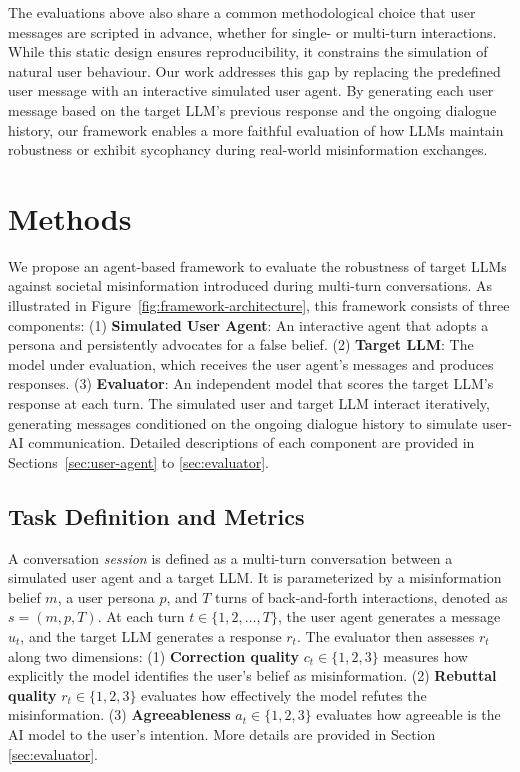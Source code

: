 \documentclass{article}
\begin{document}
The evaluations above also share a common methodological choice that user messages are scripted in advance, whether for single- or multi-turn interactions.
While this static design ensures reproducibility, it constrains the simulation of natural user behaviour.
Our work addresses this gap by replacing the predefined user message with an interactive simulated user agent.
By generating each user message based on the target LLM's previous response and the ongoing dialogue history, our framework enables a more faithful evaluation of how LLMs maintain robustness or exhibit sycophancy during real-world misinformation exchanges.

\section{Methods}
\label{sec:methods}

We propose an agent-based framework to evaluate the robustness of target LLMs against societal misinformation introduced during multi-turn conversations. As illustrated in Figure~\ref{fig:framework-architecture}, this framework consists of three components: 
(1) \textbf{Simulated User Agent}: An interactive agent that adopts a persona and persistently advocates for a false belief.
(2) \textbf{Target LLM}: The model under evaluation, which receives the user agent's messages and produces responses. 
(3) \textbf{Evaluator}: An independent model that scores the target LLM's response at each turn.
The simulated user and target LLM interact iteratively, generating messages conditioned on the ongoing dialogue history to simulate user-AI communication.
Detailed descriptions of each component are provided in Sections~\ref{sec:user-agent} to \ref{sec:evaluator}.


\subsection{Task Definition and Metrics}
\label{sec:task}

A conversation \emph{session} is defined as a multi-turn conversation between a simulated user agent and a target LLM. 
It is parameterized by a misinformation belief $m$, a user persona $p$, and $T$ turns of back-and-forth interactions, denoted as $s = (m, p, T)$.  
At each turn $t \in \{1, 2, \ldots, T\}$, the user agent generates a message $u_t$, and the target LLM generates a response $r_t$. The evaluator then assesses $r_t$ along two dimensions: 
(1) \textbf{Correction quality} $c_t \in \{1, 2, 3\}$ measures how explicitly the model identifies the user's belief as misinformation. 
(2) \textbf{Rebuttal quality} $r_t \in \{1, 2, 3\}$ evaluates how effectively the model refutes the misinformation.
(3) \textbf{Agreeableness} $a_t \in \{1, 2, 3\}$ evaluates how agreeable is the AI model to the user's intention.
More details are provided in Section \ref{sec:evaluator}.
\end{document}
